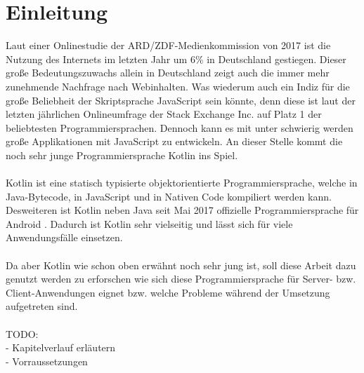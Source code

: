 
\chapter{Einleitung}
Laut einer Onlinestudie der ARD/ZDF-Medienkommission von 2017 \cite{onlineStudy2017,resultsOnlineStudy2017} ist die Nutzung des Internets im letzten Jahr um 6\% in Deutschland gestiegen. Dieser große Bedeutungszuwachs allein in Deutschland zeigt auch die immer mehr zunehmende Nachfrage nach Webinhalten. Was wiederum auch ein Indiz für die große Beliebheit der Skriptsprache JavaScript sein könnte, denn diese ist laut der letzten jährlichen Onlineumfrage der Stack Exchange Inc. \cite{developerSurvey2017} auf Platz 1 der beliebtesten Programmiersprachen. Dennoch kann es mit unter schwierig werden große Applikationen mit JavaScript zu entwickeln. An dieser Stelle kommt die noch sehr junge Programmiersprache Kotlin ins Spiel.\\
\\
Kotlin ist eine statisch typisierte objektorientierte Programmiersprache, welche in Java-Bytecode, in JavaScript und in Nativen Code kompiliert werden kann. Desweiteren ist Kotlin neben Java seit Mai 2017 offizielle Programmiersprache für Android \cite{kotlinAndroidOfficial}. Dadurch ist Kotlin sehr vielseitig und lässt sich für viele Anwendungsfälle einsetzen. \\
\\
Da aber Kotlin wie schon oben erwähnt noch sehr jung ist, soll diese Arbeit dazu genutzt werden zu erforschen wie sich diese Programmiersprache für Server- bzw. Client-Anwendungen eignet bzw. welche Probleme während der Umsetzung aufgetreten sind. \\
\\
TODO:\\
- Kapitelverlauf erläutern\\
- Vorraussetzungen\\